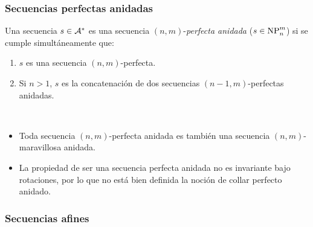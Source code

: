 \documentclass[11pt]{article}
\begin{document}
\subsubsection{Secuencias perfectas anidadas}

\begin{definition}
	Una secuencia $s \in \mathcal{A}^*$ es una secuencia $(n,m)$-\emph{perfecta
		anidada} ($s \in \text{NP}_{n}^{m}$) si se cumple simultáneamente que:
	\begin{enumerate}
		\item $s$ es una secuencia $(n,m)$-perfecta.
		\item Si $n > 1$, $s$ es la concatenación de dos secuencias
		      $(n-1,m)$-perfectas anidadas.
	\end{enumerate}
\end{definition}

\begin{remark}\ %
	\begin{itemize}
		\item Toda secuencia $(n,m)$-perfecta anidada es también una secuencia
		      $(n,m)$-maravillosa anidada.
		\item La propiedad de ser una secuencia perfecta anidada no es invariante
		      bajo rotaciones, por lo que no está bien definida la noción de collar
		      perfecto anidado.
	\end{itemize}
\end{remark}

\subsubsection{Secuencias afines}
\end{document}
